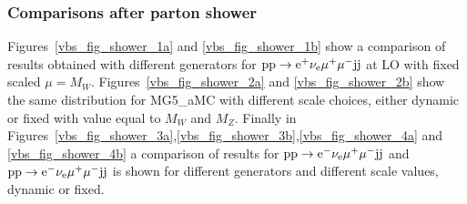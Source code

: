 \documentclass[11pt]{cernrep}
\newcommand{\MGAMC}{MG5\_aMC\xspace}
\begin{document}
\subsubsection*{Comparisons after parton shower}

Figures~\ref{vbs_fig_shower_1a} and \ref{vbs_fig_shower_1b} show a comparison of results obtained with different
generators for ${\rm p} {\rm p} \to {\rm e}^+  \nu_{\rm e}  \mu^+ \mu^- {\rm j} {\rm j}$ at LO with fixed scaled $\mu =
M_W$.
Figures~\ref{vbs_fig_shower_2a} and \ref{vbs_fig_shower_2b} show the same distribution for \MGAMC with different scale
choices, either dynamic or fixed with value equal to $M_W$ and $M_Z$.
Finally in Figures~\ref{vbs_fig_shower_3a},\ref{vbs_fig_shower_3b},\ref{vbs_fig_shower_4a} and \ref{vbs_fig_shower_4b} a
comparison of results for ${\rm p} {\rm p} \to {\rm e}^-  \nu_{\rm e}  \mu^+ \mu^- {\rm j} {\rm j}$ and ${\rm p} {\rm p}
\to {\rm e}^-  \nu_{\rm e}  \mu^+ \mu^- {\rm j} {\rm j}$ is shown for 
different generators and different scale values, dynamic or fixed.    
\end{document}
